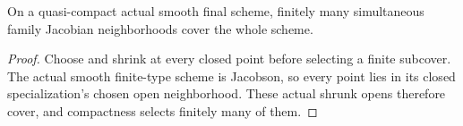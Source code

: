 \begin{lemma}\label{lem:sc0-finite-snc-family-jacobian-cover}
\leanok
{}
On a quasi-compact actual smooth final scheme, finitely many simultaneous
family Jacobian neighborhoods cover the whole scheme.
\end{lemma}
\begin{proof}
Choose and shrink at every closed point before selecting a finite subcover.
The actual smooth finite-type scheme is Jacobson, so every point lies in
its closed specialization's chosen open neighborhood. These actual shrunk
opens therefore cover, and compactness selects finitely many of them.
\end{proof}
